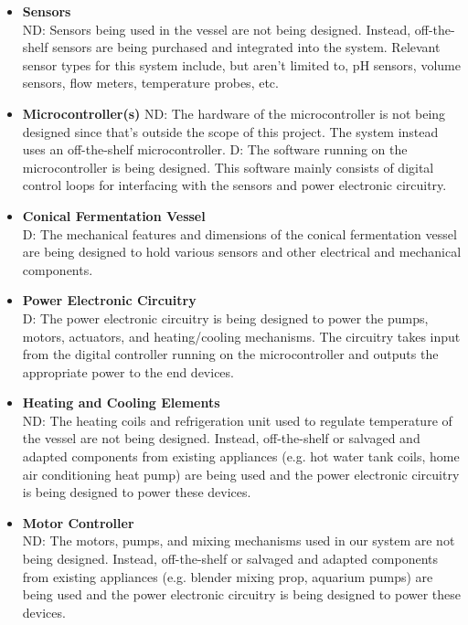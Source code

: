 \documentclass{article}
\begin{document}
\begin{itemize}
\item\textbf{Sensors}
\\ND: Sensors being used in the vessel are not being designed.  Instead, off-the-shelf sensors are being purchased and integrated into the system.  Relevant sensor types for this system include, but aren’t limited to, pH sensors, volume sensors, flow meters, temperature probes, etc.

\item\textbf{Microcontroller(s)}
ND: The hardware of the microcontroller is not being designed since that’s outside the scope of this project. The system instead uses an off-the-shelf microcontroller.
D: The software running on the microcontroller is being designed. This software mainly consists of digital control loops for interfacing with the sensors and power electronic circuitry.

\item\textbf{Conical Fermentation Vessel}
\\D: The mechanical features and dimensions of the conical fermentation vessel are being designed to hold various sensors and other electrical and mechanical components. 

\item\textbf{Power Electronic Circuitry}
\\D: The power electronic circuitry is being designed to power the pumps, motors, actuators, and heating/cooling mechanisms. The circuitry takes input from the digital controller running on the microcontroller and outputs the appropriate power to the end devices.

\item\textbf{Heating and Cooling Elements}
\\ND: The heating coils and refrigeration unit used to regulate temperature of the vessel are not being designed. Instead, off-the-shelf or salvaged and adapted components from existing appliances (e.g. hot water tank coils, home air conditioning heat pump) are being used and the power electronic circuitry is being designed to power these devices.

\item\textbf{Motor Controller}
\\ND: The motors, pumps, and mixing mechanisms used in our system are not being designed. Instead, off-the-shelf or salvaged and adapted components from existing appliances (e.g. blender mixing prop, aquarium pumps) are being used and the power electronic circuitry is being designed to power these devices.


\end{itemize}
\end{document}
